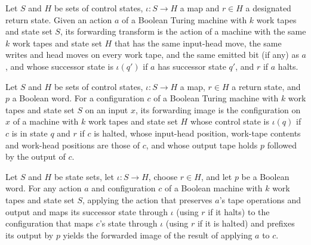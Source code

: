 \begin{definition}
\label{Turing.emitAction}
\leanok
{}
Let $S$ and $H$ be sets of control states, $\iota : S \to H$ a map and $r \in H$ a
designated return state. Given an action $a$ of a Boolean Turing machine with $k$ work
tapes and state set $S$, its forwarding transform is the action of a machine with the
same $k$ work tapes and state set $H$ that has the same input-head move, the same writes
and head moves on every work tape, and the same emitted bit (if any) as $a$, and whose
successor state is $\iota(q')$ if $a$ has successor state $q'$, and $r$ if $a$ halts.
\end{definition}

\begin{definition}
\label{Turing.emitCfg}
\leanok
{}
Let $S$ and $H$ be sets of control states, $\iota : S \to H$ a map, $r \in H$ a return
state, and $p$ a Boolean word. For a configuration $c$ of a Boolean Turing machine with
$k$ work tapes and state set $S$ on an input $x$, its forwarding image is the
configuration on $x$ of a machine with $k$ work tapes and state set $H$ whose control
state is $\iota(q)$ if $c$ is in state $q$ and $r$ if $c$ is halted, whose input-head
position, work-tape contents and work-head positions are those of $c$, and whose output
tape holds $p$ followed by the output of $c$.
\end{definition}

\begin{lemma}
\label{Turing.emit_apply}
\leanok
{}
Let $S$ and $H$ be state sets, let $\iota:S\to H$, choose $r\in H$, and let $p$ be a
Boolean word. For any action $a$ and configuration $c$ of a Boolean machine with $k$
work tapes and state set $S$, applying the action that preserves $a$'s tape operations
and output and maps its successor state through $\iota$ (using $r$ if it halts) to the
configuration that maps $c$'s state through $\iota$ (using $r$ if it is halted) and
prefixes its output by $p$ yields the forwarded image of the result of applying $a$ to
$c$.
\end{lemma}

